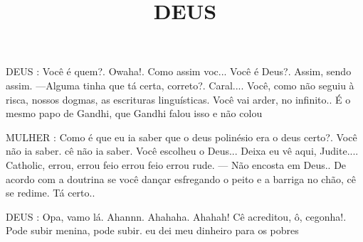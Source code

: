 \documentclass[10pt]{article}
\author{}
\title{\vspace{-3.5cm}DEUS}
\date{}
\newcommand{\mychar}[1]{
  \bigskip
  \hspace{-2em} \MakeUppercase{#1}
}
\begin{document}
\maketitle



\mychar{DEUS}: Você é quem?. Owaha!. Como assim voc... Você é Deus?. Assim, sendo assim. —Alguma tinha que tá certa, correto?. Caral.... Você, como não seguiu à risca, nossos dogmas, as escrituras linguísticas. Você vai arder, no infinito.. É o mesmo papo de Gandhi, que Gandhi falou isso e não colou

\mychar{MULHER}: Como é que eu ia saber que o deus polinésio era o deus certo?. Você não ia saber. cê não ia saber. Você escolheu o Deus... Deixa eu vê aqui, Judite.... Catholic, errou, errou feio errou feio errou rude. — Não encosta em Deus.. De acordo com a doutrina se você dançar esfregando  o peito e a barriga no chão, cê se redime. Tá certo..

\mychar{DEUS}: Opa, vamo lá. Ahannn. Ahahaha. Ahahah! Cê acreditou, ô, cegonha!. Pode subir menina, pode subir. eu dei meu dinheiro para os pobres
\end{document}
